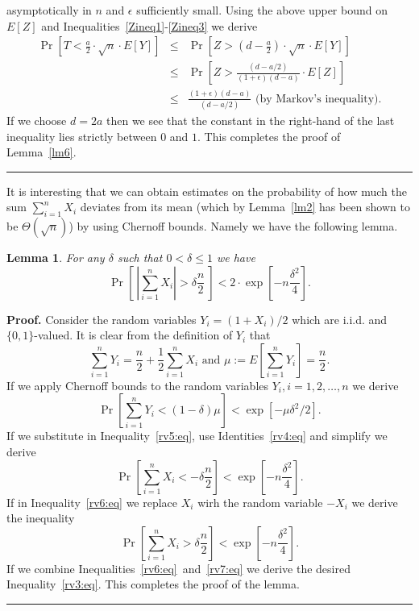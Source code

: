 \documentclass[12pt]{article}
\newtheorem{lemma}{Lemma}
\def\qed{\hfill\rule{2mm}{2mm}}
\begin{document}
asymptotically in $n$ and $\epsilon$ sufficiently small. 
Using the above upper bound on $E[Z]$ and 
Inequalities~\ref{Zineq1}-\ref{Zineq3} we derive
\begin{eqnarray*}
\Pr \left[T < \frac{a}{2} \cdot \sqrt{n} \cdot E[Y]\right]
& \leq &
\Pr \left[Z > \left(d-\frac{a}{2}\right) \cdot \sqrt{n} \cdot E[Y]\right] \\
& \leq &
\Pr \left[ Z > \frac{(d-a/2)}{(1+\epsilon)(d-a)} \cdot E[Z] \right] \\
& \leq &
\frac{(1+\epsilon)(d-a)}{(d-a/2)}
\mbox{ (by Markov's inequality)} .
\end{eqnarray*}
If we choose $d = 2a$ then we see that the constant in the
right-hand of the last inequality lies strictly between $0$ and $1$.
This completes the proof of Lemma~\ref{lm6}.
\qed 


It is interesting that we can obtain estimates 
on the probability of how much the sum $\sum_{i=1}^n X_i$ deviates
from its mean (which by Lemma~\ref{lm2} has been shown 
to be $\Theta (\sqrt{n})$) by 
using Chernoff bounds. Namely we have the following lemma.
\begin{lemma}
\label{lm3}
For any $\delta$ such that $0 < \delta \leq 1$ we have
\begin{equation}
\label{rv3:eq}
\Pr \left[ ~\left| \sum_{i=1}^n X_i \right| > \delta \frac{n}{2} ~ \right]
< 2 \cdot \exp \left[ - n \frac{\delta^2}{4} \right].
\end{equation}
\end{lemma}
{\bf Proof.}
Consider the random variables $Y_i = (1+X_i)/2$ which are i.i.d. and
$\{ 0, 1\}$-valued. It is clear from the definition of $Y_i$ that 
\begin{equation}
\label{rv4:eq}
\sum_{i=1}^n Y_i = \frac{n}{2} + \frac{1}{2} \sum_{i=1}^n X_i
\mbox{ and } \mu:= E\left[ \sum_{i=1}^n Y_i \right] = \frac{n}{2} .
\end{equation}
If we apply Chernoff bounds to the random variables $Y_i, 
i=1,2,\ldots ,n$ we derive
\begin{equation}
\label{rv5:eq}
\Pr \left[  \sum_{i=1}^n Y_i  < (1- \delta) \mu  \right]
< \exp \left[ - \mu \delta^2 /2 \right].
\end{equation}
If we substitute in Inequality~\ref{rv5:eq}, use Identities~\ref{rv4:eq}
and simplify we derive
\begin{equation}
\label{rv6:eq}
\Pr \left[  \sum_{i=1}^n X_i  < - \delta \frac{n}{2}  \right]
< \exp \left[ - n \frac{\delta^2}{4}  \right].
\end{equation}
If in Inequality~\ref{rv6:eq} we replace $X_i$ wirh the random variable
$-X_i$ we derive the inequality
\begin{equation}
\label{rv7:eq}
\Pr \left[  \sum_{i=1}^n X_i  > \delta \frac{n}{2}  \right]
< \exp \left[ - n \frac{\delta^2}{4}  \right].
\end{equation}
If we combine Inequalities~\ref{rv6:eq}~and~\ref{rv7:eq} we derive
the desired Inequality~\ref{rv3:eq}. This completes the
proof of the lemma.
\qed
\end{document}
